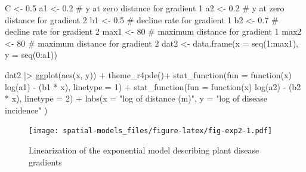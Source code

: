\documentclass[
  letterpaper,
]{book}
\newenvironment{Shaded}{\begin{snugshade}}{\end{snugshade}}
\newcommand{\AttributeTok}[1]{\textcolor[rgb]{0.40,0.45,0.13}{#1}}
\newcommand{\CommentTok}[1]{\textcolor[rgb]{0.37,0.37,0.37}{#1}}
\newcommand{\ControlFlowTok}[1]{\textcolor[rgb]{0.00,0.23,0.31}{#1}}
\newcommand{\DecValTok}[1]{\textcolor[rgb]{0.68,0.00,0.00}{#1}}
\newcommand{\FloatTok}[1]{\textcolor[rgb]{0.68,0.00,0.00}{#1}}
\newcommand{\FunctionTok}[1]{\textcolor[rgb]{0.28,0.35,0.67}{#1}}
\newcommand{\NormalTok}[1]{\textcolor[rgb]{0.00,0.23,0.31}{#1}}
\newcommand{\OtherTok}[1]{\textcolor[rgb]{0.00,0.23,0.31}{#1}}
\newcommand{\SpecialCharTok}[1]{\textcolor[rgb]{0.37,0.37,0.37}{#1}}
\newcommand{\StringTok}[1]{\textcolor[rgb]{0.13,0.47,0.30}{#1}}
\begin{document}
\begin{Shaded}
\begin{Highlighting}[]
\NormalTok{C }\OtherTok{\textless{}{-}} \FloatTok{0.5}
\NormalTok{a1 }\OtherTok{\textless{}{-}} \FloatTok{0.2} \CommentTok{\# y at zero distance for gradient 1}
\NormalTok{a2 }\OtherTok{\textless{}{-}} \FloatTok{0.2} \CommentTok{\# y at zero distance for gradient 2}
\NormalTok{b1 }\OtherTok{\textless{}{-}} \FloatTok{0.5} \CommentTok{\# decline rate for gradient 1}
\NormalTok{b2 }\OtherTok{\textless{}{-}} \FloatTok{0.7} \CommentTok{\# decline rate for gradient 2}
\NormalTok{max1 }\OtherTok{\textless{}{-}} \DecValTok{80} \CommentTok{\# maximum distance for gradient 1}
\NormalTok{max2 }\OtherTok{\textless{}{-}} \DecValTok{80} \CommentTok{\# maximum distance for gradient 2}
\NormalTok{dat2 }\OtherTok{\textless{}{-}} \FunctionTok{data.frame}\NormalTok{(}\AttributeTok{x =} \FunctionTok{seq}\NormalTok{(}\DecValTok{1}\SpecialCharTok{:}\NormalTok{max1), }\AttributeTok{y =} \FunctionTok{seq}\NormalTok{(}\DecValTok{0}\SpecialCharTok{:}\NormalTok{a1))}

\NormalTok{dat2 }\SpecialCharTok{|\textgreater{}}
  \FunctionTok{ggplot}\NormalTok{(}\FunctionTok{aes}\NormalTok{(x, y)) }\SpecialCharTok{+}
  \FunctionTok{theme\_r4pde}\NormalTok{()}\SpecialCharTok{+}
  \FunctionTok{stat\_function}\NormalTok{(}\AttributeTok{fun =} \ControlFlowTok{function}\NormalTok{(x) }\FunctionTok{log}\NormalTok{(a1) }\SpecialCharTok{{-}}\NormalTok{ (b1 }\SpecialCharTok{*}\NormalTok{ x), }\AttributeTok{linetype =} \DecValTok{1}\NormalTok{) }\SpecialCharTok{+}
  \FunctionTok{stat\_function}\NormalTok{(}\AttributeTok{fun =} \ControlFlowTok{function}\NormalTok{(x) }\FunctionTok{log}\NormalTok{(a2) }\SpecialCharTok{{-}}\NormalTok{ (b2 }\SpecialCharTok{*}\NormalTok{ x), }\AttributeTok{linetype =} \DecValTok{2}\NormalTok{) }\SpecialCharTok{+}
  \FunctionTok{labs}\NormalTok{(}\AttributeTok{x =} \StringTok{"log of distance (m)"}\NormalTok{, }\AttributeTok{y =} \StringTok{"log of disease incidence"}
\NormalTok{  )}
\end{Highlighting}
\end{Shaded}

\begin{figure}

\texttt{[image: spatial-models\_files/figure-latex/fig-exp2-1.pdf]} \hfill{}

\caption{\label{fig-exp2}Linearization of the exponential model
describing plant disease gradients}

\end{figure}
\end{document}
